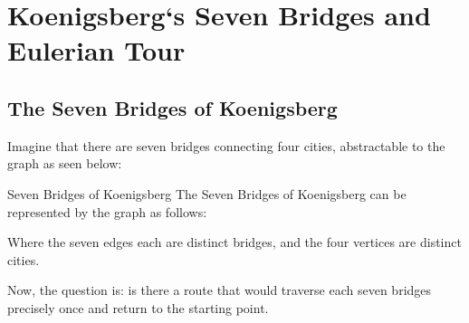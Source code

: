 \section{Koenigsberg`s Seven Bridges and Eulerian Tour}

\subsection{The Seven Bridges of Koenigsberg}
Imagine that there are seven bridges connecting four cities, abstractable to the graph as seen below:
\begin{ln-fig}{Seven Bridges of Koenigsberg}{}
    The Seven Bridges of Koenigsberg can be represented by the graph as follows:
    \begin{center}
    \end{center}
    Where the seven edges each are distinct bridges, and the four vertices are distinct cities.
\end{ln-fig}
Now, the question is: is there a route that would traverse each seven bridges precisely once and return to the starting point.

